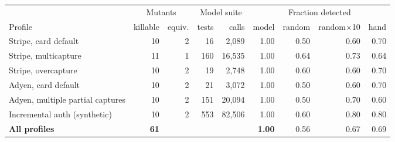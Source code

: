 \begin{tabular}{lrrrrrrrr}
\toprule
& \multicolumn{2}{c}{Mutants} & \multicolumn{2}{c}{Model suite} & \multicolumn{4}{c}{Fraction detected} \\
\cmidrule(lr){2-3}\cmidrule(lr){4-5}\cmidrule(lr){6-9}
Profile & killable & equiv. & tests & calls & model & random & random$\times$10 & hand \\
\midrule
Stripe, card default & 10 & 2 & 16 & 2,089 & 1.00 & 0.50 & 0.60 & 0.70 \\
Stripe, multicapture & 11 & 1 & 160 & 16,535 & 1.00 & 0.64 & 0.73 & 0.64 \\
Stripe, overcapture & 10 & 2 & 19 & 2,748 & 1.00 & 0.60 & 0.60 & 0.70 \\
Adyen, card default & 10 & 2 & 21 & 3,072 & 1.00 & 0.50 & 0.60 & 0.70 \\
Adyen, multiple partial captures & 10 & 2 & 151 & 20,094 & 1.00 & 0.50 & 0.70 & 0.60 \\
Incremental auth (synthetic) & 10 & 2 & 553 & 82,506 & 1.00 & 0.60 & 0.80 & 0.80 \\
\midrule
\textbf{All profiles} & \textbf{61} &  &  &  & \textbf{1.00} & 0.56 & 0.67 & 0.69 \\
\bottomrule
\end{tabular}
